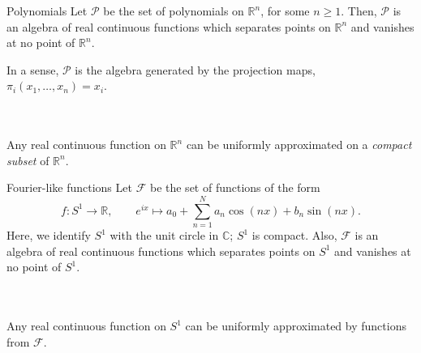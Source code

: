 \documentclass{beamer}
\def\C{\mathbb{C}}
\def\R{\mathbb{R}}
\begin{document}
    \begin{frame}{Polynomials}
        Let $\mathscr{P}$ be the set of polynomials on $\R^n$, for some $n \geq 1$.
        Then, $\mathscr{P}$ is an algebra of real continuous functions which
        separates points on $\R^n$ and vanishes at no point of $\R^n$.

        In a sense, $\mathscr{P}$ is the algebra generated by the projection maps,
        $\pi_i(x_1, \dots, x_n) = x_i$.

        \\~\\

        Any real continuous function on $\R^n$ can be uniformly approximated on a
        \emph{compact subset} of $\R^n$.
    \end{frame}

    \begin{frame}{Fourier-like functions}
        Let $\mathscr{F}$ be the set of functions of the form \[
            f\colon S^1 \to \R, \qquad e^{ix} \mapsto a_0 + \sum_{n = 1}^N a_n\cos(nx) +
            b_n \sin(nx).
        \] Here, we identify $S^1$ with the unit circle in $\C$; $S^1$ is compact.
        Also, $\mathscr{F}$ is an algebra of real continuous functions which
        separates points on $S^1$ and vanishes at no point of $S^1$.

        \\~\\

        Any real continuous function on $S^1$ can be uniformly approximated by
        functions from $\mathscr{F}$.
    \end{frame}
\end{document}
